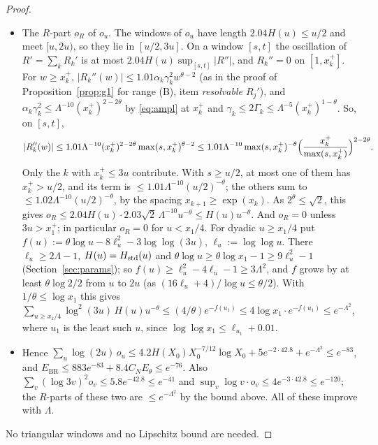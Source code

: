 \begin{proof}
\begin{itemize}
\item The $R$-part $o_R$ of $o_u$. The windows of $o_u$ have length $2.04H(u)\le u/2$ and meet $[u,2u)$, so they lie in $[u/2,3u]$. On a
  window $[s,t]$ the oscillation of $R'=\sum_kR_k'$ is at most $2.04H(u)\sup_{[s,t]}|R''|$, and $R_k''=0$ on $[1,x_k^+]$. For
  $w\ge x_k^+$, $|R_k''(w)|\le1.01\alpha_k\gamma_k^2w^{\theta-2}$ (as in the proof of Proposition~\ref{prop:g1} for range (B),
  item \emph{resolvable $R_j'$}), and $\alpha_k\gamma_k^2\le\Lambda^{-10}(x_k^+)^{2-2\theta}$ by \eqref{eq:ampl} at $x_k^+$ and
  $\gamma_k\le2\Gamma_k\le\Lambda^{-5}(x_k^+)^{1-\theta}$. So, on $[s,t]$,
  \[
    |R_k''(w)|\le1.01\Lambda^{-10}(x_k^+)^{2-2\theta}\max(s,x_k^+)^{\theta-2}\le1.01\Lambda^{-10}\max(s,x_k^+)^{-\theta}\Bigl(\frac{x_k^+}{\max(s,x_k^+)}\Bigr)^{2-2\theta}.
  \]
  Only the $k$ with $x_k^+\le3u$ contribute. With $s\ge u/2$, at most one of them has $x_k^+>u/2$, and its term is
  $\le1.01\Lambda^{-10}(u/2)^{-\theta}$; the others sum to $\le1.02\Lambda^{-10}(u/2)^{-\theta}$, by the spacing $x_{k+1}\ge\exp(x_k)$. As
  $2^\theta\le\sqrt2$, this gives $o_R\le2.04H(u)\cdot2.03\sqrt2\,\Lambda^{-10}u^{-\theta}\le H(u)u^{-\theta}$. And $o_R=0$ unless
  $3u>x_1^+$; in particular $o_R=0$ for $u<x_1/4$.
  For dyadic $u\ge x_1/4$ put $f(u):=\theta\log u-8\ell_u^2-3\log\log(3u)$, $\ell_u:=\log\log u$. There $\ell_u\ge2\Lambda-1$,
  $H(u)=H_{\mathrm{std}}(u)$ and $\theta\log u\ge\theta\log x_1-1\ge9\ell_u^2-1$ (Section~\ref{sec:params}); so $f(u)\ge\ell_u^2-4\ell_u-1\ge3\Lambda^2$,
  and $f$ grows by at least $\theta\log2/2$ from $u$ to $2u$ (as $(16\ell_u+4)/\log u\le\theta/2$). With $1/\theta\le\log x_1$ this gives
  $\sum_{u\ge x_1/4}\log^2(3u)\,H(u)u^{-\theta}\le(4/\theta)e^{-f(u_1)}\le4\log x_1\cdot e^{-f(u_1)}\le e^{-\Lambda^2}$, where $u_1$ is the
  least such $u$, since $\log\log x_1\le\ell_{u_1}+0.01$.
\item Hence $\sum_u\log(2u)\,o_u\le4.2H(X_0)X_0^{-7/12}\log X_0+5e^{-2\cdot42.8}+e^{-\Lambda^2}\le e^{-83}$, and
  $E_{\mathrm{BR}}\le883e^{-83}+8.4C_NE_\theta\le e^{-76}$. Also $\sum_v(\log3v)^2o_v\le5.8e^{-42.8}\le e^{-41}$ and
  $\sup_v\log v\cdot o_v\le4e^{-3\cdot42.8}\le e^{-120}$; the $R$-parts of these two are $\le e^{-\Lambda^2}$ by the bound above. All
  of these improve with $\Lambda$.
\end{itemize}
No triangular windows and no Lipschitz bound are needed.
\end{proof}

